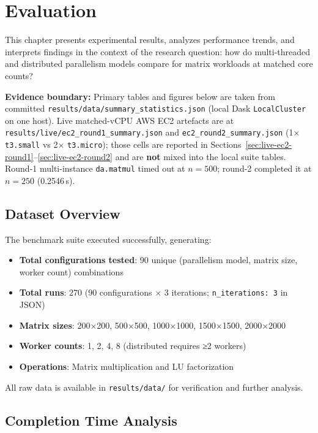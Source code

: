 \chapter{Evaluation}

This chapter presents experimental results, analyzes performance trends, and interprets findings in the context of the research question: how do multi-threaded and distributed parallelism models compare for matrix workloads at matched core counts?

\textbf{Evidence boundary:} Primary tables and figures below are taken from committed \texttt{results/data/summary\_statistics.json} (local Dask \texttt{LocalCluster} on one host). Live matched-vCPU AWS EC2 artefacts are at \texttt{results/live/ec2\_round1\_summary.json} and \texttt{ec2\_round2\_summary.json} (1× \texttt{t3.small} vs 2× \texttt{t3.micro}); those cells are reported in Sections~\ref{sec:live-ec2-round1}--\ref{sec:live-ec2-round2} and are \textbf{not} mixed into the local suite tables. Round-1 multi-instance \texttt{da.matmul} timed out at $n{=}500$; round-2 completed it at $n{=}250$ (0.2546\,s).

\section{Dataset Overview}

The benchmark suite executed successfully, generating:

\begin{itemize}
    \item \textbf{Total configurations tested}: 90 unique (parallelism model, matrix size, worker count) combinations
    \item \textbf{Total runs}: 270 (90 configurations × 3 iterations; \texttt{n\_iterations: 3} in JSON)
    \item \textbf{Matrix sizes}: 200×200, 500×500, 1000×1000, 1500×1500, 2000×2000
    \item \textbf{Worker counts}: 1, 2, 4, 8 (distributed requires ≥2 workers)
    \item \textbf{Operations}: Matrix multiplication and LU factorization
\end{itemize}

All raw data is available in \texttt{results/data/} for verification and further analysis.

\section{Completion Time Analysis}

